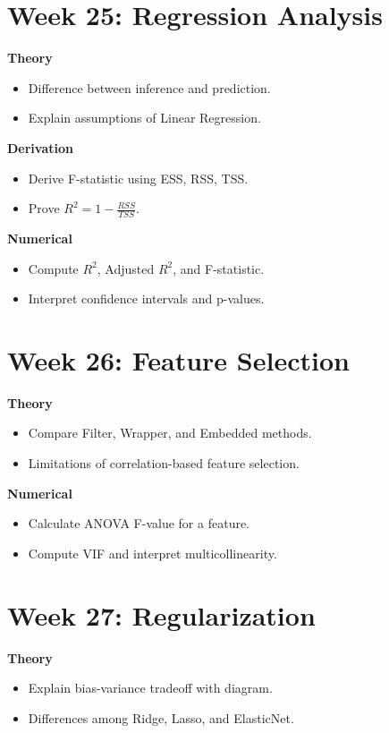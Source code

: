 \documentclass[12pt]{article}
\begin{document}
\section*{Week 25: Regression Analysis}
\textbf{Theory}
\begin{itemize}
\item Difference between inference and prediction.
\item Explain assumptions of Linear Regression.
\end{itemize}

\textbf{Derivation}
\begin{itemize}
\item Derive F-statistic using ESS, RSS, TSS.
\item Prove $R^2 = 1 - \frac{RSS}{TSS}$.
\end{itemize}

\textbf{Numerical}
\begin{itemize}
\item Compute $R^2$, Adjusted $R^2$, and F-statistic.
\item Interpret confidence intervals and p-values.
\end{itemize}

\section*{Week 26: Feature Selection}
\textbf{Theory}
\begin{itemize}
\item Compare Filter, Wrapper, and Embedded methods.
\item Limitations of correlation-based feature selection.
\end{itemize}

\textbf{Numerical}
\begin{itemize}
\item Calculate ANOVA F-value for a feature.
\item Compute VIF and interpret multicollinearity.
\end{itemize}

\section*{Week 27: Regularization}
\textbf{Theory}
\begin{itemize}
\item Explain bias-variance tradeoff with diagram.
\item Differences among Ridge, Lasso, and ElasticNet.
\end{itemize}
\end{document}
